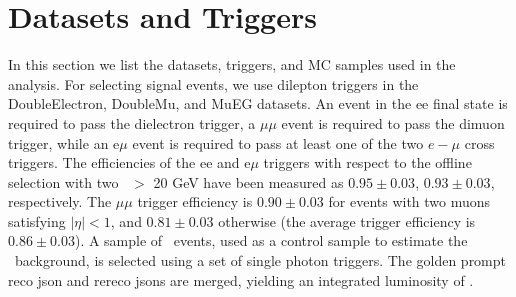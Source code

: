 \clearpage

\section{Datasets and Triggers}
\label{sec:datasets}

In this section we list the datasets, triggers, and MC samples used in the analysis. For selecting signal
events, we use dilepton triggers in the DoubleElectron, DoubleMu, and MuEG datasets. 
An event in the ee final state is required to pass the dielectron trigger, a 
$\mu\mu$ event is required to pass the dimuon trigger, while an e$\mu$ event is required to pass at least one 
of the two $e-\mu$ cross triggers. The efficiencies of the ee and e$\mu$ triggers with respect to the
offline selection with two \pt\ $>$ 20 GeV have been measured as $0.95\pm0.03$, $0.93\pm0.03$, respectively.
The $\mu\mu$ trigger efficiency is $0.90\pm0.03$ for events with two muons satisfying $|\eta|<1$, and $0.81\pm0.03$ otherwise
(the average trigger efficiency is $0.86\pm0.03$).
A sample of \gjets\ events, used as a control sample to estimate the \zjets\
background, is selected using a set of single photon triggers.
The golden prompt reco json and rereco jsons are merged, yielding an integrated luminosity of \lumi.

